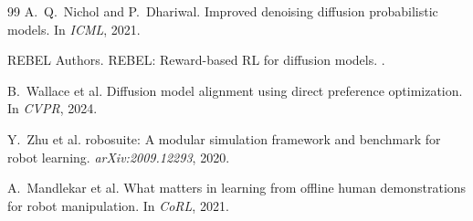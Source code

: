 \documentclass{article}
\begin{document}
\begin{thebibliography}{99}
A.~Q.~Nichol and P.~Dhariwal.
\newblock Improved denoising diffusion probabilistic models.
\newblock In \emph{ICML}, 2021.

REBEL Authors.
\newblock REBEL: Reward-based RL for diffusion models.
.

B.~Wallace et al.
\newblock Diffusion model alignment using direct preference optimization.
\newblock In \emph{CVPR}, 2024.

Y.~Zhu et al.
\newblock robosuite: A modular simulation framework and benchmark for robot learning.
\newblock \emph{arXiv:2009.12293}, 2020.

A.~Mandlekar et al.
\newblock What matters in learning from offline human demonstrations for robot manipulation.
\newblock In \emph{CoRL}, 2021.

\end{thebibliography}
\end{document}
